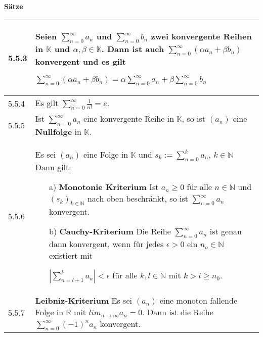     \noindent 
    \textbf{Sätze}
    \begin{table}[H]
    \begin{tabularx}{\textwidth}{X m{16cm}}
        \toprule

        5.5.3 & Seien $\sum^{\infty}_{n=0} a_n$ und $\sum^{\infty}_{n=0} b_n$ zwei konvergente Reihen in $\mathbb{K}$ und 
                $\alpha, \beta \in \mathbb{K}$. Dann ist auch $\sum^{\infty}_{n=0} (\alpha a_n + \beta b_n)$ konvergent und es gilt \hfill \break
                \centerline{$\sum^{\infty}_{n=0} (\alpha a_n + \beta b_n) = \alpha \sum^{\infty}_{n=0} a_n + \beta \sum^{\infty}_{n=0} b_n$}  \\
        \midrule
        5.5.4 & Es gilt $\sum^{\infty}_{n=0} \frac{1}{n!} = e$. \\
        \midrule
        5.5.5 & Ist $\sum^{\infty}_{n=0} a_n$ eine konvergente Reihe in $\mathbb{K}$, so ist $(a_n)$ eine \textbf{Nullfolge} in $\mathbb{K}$. \\
        \midrule
        5.5.6 & Es sei $(a_n)$ eine Folge in $\mathbb{K}$ und $s_k := \sum^{k}_{n=0} a_n$, $k \in \mathbb{N}$ Dann gilt:
                \begin{itemize}
                    \item[a)] \textbf{Monotonie Kriterium} \hfill \break
                                Ist $a_n \geq 0$ für alle $n \in \mathbb{N}$ und $(s_k)_{k \in \mathbb{N}}$ nach oben beschränkt, so
                                ist $\sum^{\infty}_{n=0} a_n$ konvergent.
                    \item[b)] \textbf{Cauchy-Kriterium} \hfill \break
                                Die Reihe $\sum^{\infty}_{n=0} a_n$ ist genau dann konvergent, wenn für jedes $\epsilon > 0$ ein $n_o \in \mathbb{N}$
                                existiert mit \hfill \break
                                \centerline{$|\sum^{k}_{n=l+1} a_n| < \epsilon$ für alle $k, l \in \mathbb{N}$ mit $k > l \geq n_0$.}
                \end{itemize} \\
        \midrule
        5.5.7 & \textbf{Leibniz-Kriterium} \hfill \break
                Es sei $(a_n)$ eine monoton fallende Folge in $\mathbb{R}$ mit $lim_{n \rightarrow \infty} a_n = 0$. Dann ist die 
                Reihe $\sum^{\infty}_{n=0} (-1)^n a_n$ konvergent. \\

        \bottomrule
    \end{tabularx}
    \end{table}

